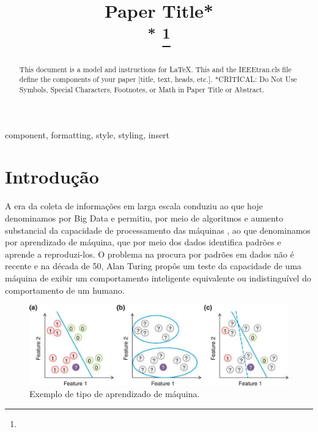 \documentclass[conference]{IEEEtran}
\begin{document}
\title{Paper Title*\\
{\footnotesize \textsuperscript{*}}
\thanks{}
}

\author{
\and
{}

}

\maketitle

\begin{abstract}
This document is a model and instructions for \LaTeX.
This and the IEEEtran.cls file define the components of your paper [title, text, heads, etc.]. *CRITICAL: Do Not Use Symbols, Special Characters, Footnotes, 
or Math in Paper Title or Abstract.
\end{abstract}

\begin{IEEEkeywords}
component, formatting, style, styling, insert
\end{IEEEkeywords}

\section{Introdução}
  A era da coleta de informações  em larga escala conduziu ao que hoje denominamos por Big Data\cite{b11} e permitiu, por meio de algoritmos e aumento substancial da capacidade de processamento das máquinas , ao que denominamos por aprendizado de máquina, que por meio dos dados identifica padrões e aprende a reproduzi-los. O problema na procura por padrões em dados não é recente e na década de 50, Alan Turing propôs um teste da capacidade de uma máquina de exibir um comportamento inteligente equivalente ou indistinguível do comportamento de um humano.
  
 \begin{figure}[htbp]
\centerline{\includegraphics[scale=0.5]{imagem_aprendizado.png}}
\caption{Exemplo de tipo de aprendizado de máquina.}
\label{fig1}
\end{figure}
\end{document}
